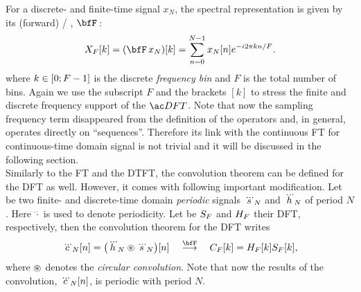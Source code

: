 \mynewline
For a discrete- and finite-time signal $x_N$, the spectral representation is given by its (forward) \DFTdef/
,
$\discreteFT{}$:
\begin{equation}\label{eq:processing:dft}
    X_F[ k] = (\discreteFT{x_N})[k] =
    \sum_{n = 0}^{N - 1}
    x_N[ n]
    \cste^{-\csti2\pi k n / F}
    .
\end{equation}
where $k \in \kintervcc{0}{F - 1}$ is the discrete \textit{frequency bin} and $F$ is the total number of bins.
Again we use the subscript $F$ and the brackets $[k]$ to stress the finite and discrete frequency support of the $\DFT/$.
Note that now the sampling frequency term disappeared from the definition of the operators and, in general, operates directly on ``sequences''.
Therefore its link with the continuous \ac{FT} for continuous-time domain signal is not trivial and it will be discussed in the following section.
\\Similarly to the \ac{FT} and the \ac{DTFT}, the convolution theorem can be defined for the \ac{DFT} as well.
However, it comes with following important modification.
Let be two finite- and discrete-time domain \textit{periodic} signals $\dddot{s}_N$ and $\dddot{h}_N$ of period $N$.
Here $\dddot{\cdot}$ is used to denote periodicity.
Let be $S_F$ and $H_F$ their \ac{DFT}, respectively, then the convolution theorem for the \ac{DFT} writes
\begin{equation}\label{eq:processing:conv_dtft}
    \dddot{\img}_N[n] = \kparen{\dddot{\rir}_N \circledast \dddot{\src}_N} [ n]
    \mathspace\overset{\discreteFT}{\kto}\mathspace
    \IMG_{F}[k] =  \FLT_{F}[k] \SRC_{F}[k]
    ,
\end{equation}
where $\circledast$ denotes the \textit{circular convolution}. Note that now the results of the convolution, $\dddot{c}_N[n]$, is periodic with period $N$.


